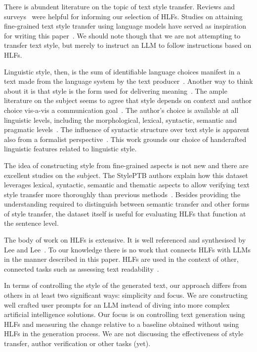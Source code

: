 \documentclass[11pt]{article}
\begin{document}
There is abundent literature on the topic of text style transfer.
Reviews and surveys~\cite{tst-review-2021,tst-survey-2022} were helpful for
informing our selection of HLFs.
Studies on attaining fine-grained text style transfer using language models
have served as inspiration for writing this paper~\cite{lyu-etal-2023-fine}.
We should note though that we are not attempting to transfer text style, but
merely to instruct an LLM to follow instructions based on HLFs.

Linguistic style, then, is the sum of identifiable language choices manifest in
a text made from the language system by the text
producer~\cite{lugea2023stylistics}.
Another way to think about it is that style is the form used for delivering
meaning~\cite{tst_sigkdd_review_2022}.
The ample literature on the subject seems to agree that style depends on context
and author choice vis-a-vis a communication
goal~\cite{mcdonald1985computational,hovy1987generating}.
The author's choice is available at all linguistic levels, including the
morphological, lexical, syntactic, semantic and pragmatic
levels~\cite{dimarco1994model,lugea2023stylistics}.
The influence of syntactic structure over text style is apparent also from a
formalist perspective~\cite{chomsky2002syntactic}.
This work grounds our choice of handcrafted linguistic features related to
linguistic style.

The idea of constructing style from fine-grained aspects is not new and there
are excellent studies on the subject.
The StylePTB authors explain how this dataset leverages lexical, syntactic,
semantic and thematic aspects to allow verifying text style transfer more
thoroughly than previous methods~\cite{lyu-etal-2021-styleptb}.
Besides providing the understanding required to distinguish between semantic
transfer and other forms of style transfer, the dataset itself is useful for
evaluating HLFs that function at the sentence level.

The body of work on HLFs is extensive.
It is well referenced and synthesised by Lee and Lee~\cite{lftk-2023}.
To our knowledge there is no work that connects HLFs with LLMs in the manner
described in this paper.
HLFs are used in the context of other, connected tasks such as assessing text
readability~\cite{lee-etal-2021-pushing}.

In terms of controlling the style of the generated text, our approach differs
from others in at least two significant ways: simplicity and focus.
We are constructing well crafted user prompts for an LLM instead of diving into
more complex artificial intelligence solutions.
Our focus is on controlling text generation using HLFs and measuring the change
relative to a baseline obtained without using HLFs in the generation process.
We are not discussing the effectiveness of style transfer, author verification
or other tasks (yet).
\end{document}
